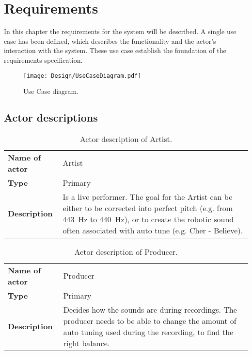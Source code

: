 
\chapter{Requirements}

In this chapter the requirements for the system will be described.
A single use case has been defined, which describes the functionality and the actor's interaction with the \systemName system.
These use case establish the foundation of the requirements specification.

\begin{figure}[H]
	\centering
	\texttt{[image: Design/UseCaseDiagram.pdf]}
	\caption{Use Case diagram.}
	\label{fig:UCDiagram}
\end{figure}

\section{Actor descriptions}

\begin{table}[H]
	\centering
	\begin{tabularx}{\textwidth}{p{} X}
		\toprule
		\textbf{Name of actor} & Artist \\
		\textbf{Type} & Primary \\
		\textbf{Description} & Is a live performer.
		The goal for the Artist can be either to be corrected into perfect pitch (e.g. from \SI{443}{\hertz} to \SI{440}{\hertz}), or to create the robotic sound often associated with auto tune (e.g. Cher - Believe). \\
		\bottomrule
	\end{tabularx}
	\caption{Actor description of Artist.}
	\label{tab:actorArtist}
\end{table}

\begin{table}[H]
	\centering
	\begin{tabularx}{\textwidth}{p{} X}
		\toprule
		\textbf{Name of actor} & Producer \\
		\textbf{Type} & Primary \\
		\textbf{Description} & Decides how the sounds are during recordings. The producer needs to be able to change the amount of auto tuning used during the recording, to find the right balance. \\
		\bottomrule
	\end{tabularx}
	\caption{Actor description of Producer.}
	\label{tab:actorProducer}
\end{table}


